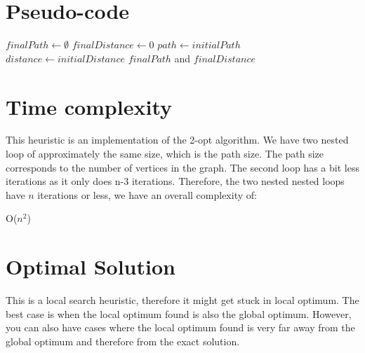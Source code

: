 \documentclass[a4paper, 12pt]{report}
\begin{document}
		\section{Pseudo-code}
			\begin{algorithm}
				\DontPrintSemicolon
				\BlankLine
				$finalPath \leftarrow \emptyset$\;
				$finalDistance \leftarrow 0$\;
				\BlankLine
				$path \leftarrow initialPath$\;
				$distance \leftarrow initialDistance$\;
				\BlankLine
				\Return $finalPath$ and $finalDistance$\;
			\end{algorithm}
		
		\section{Time complexity}
		This heuristic is an implementation of the 2-opt algorithm. We have two nested loop of approximately the same size, which is the path size. The path size corresponds to the number of vertices in the graph. The second loop has a bit less iterations as it only does n-3 iterations.
		Therefore, the two nested nested loops have $n$ iterations or less, we have an overall complexity of:
		\begin{center}
			O($n^{2}$)
		\end{center}
		\section{Optimal Solution}
		This is a local search heuristic, therefore it might get stuck in local optimum. The best case is when the local optimum found is also the global optimum. However, you can also have cases where the local optimum found is very far away from the global optimum and therefore from the exact solution.
\end{document}
